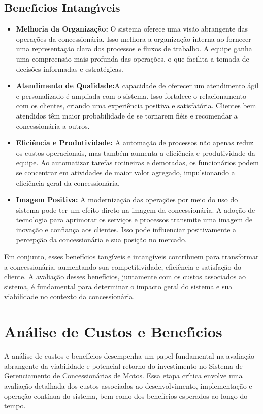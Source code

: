        \subsection{Benef\'{\i}cios Intang\'{\i}veis}
		\begin{itemize}
			\item \textbf{Melhoria da Organização:} O sistema oferece uma visão abrangente das operações da concessionária. Isso melhora a organização interna ao fornecer uma representação clara dos processos e fluxos de trabalho. A equipe ganha uma compreensão mais profunda das operações, o que facilita a tomada de decisões informadas e estratégicas.
			
			\item \textbf{Atendimento de Qualidade:}A capacidade de oferecer um atendimento ágil e personalizado é ampliada com o sistema. Isso fortalece o relacionamento com os clientes, criando uma experiência positiva e satisfatória. Clientes bem atendidos têm maior probabilidade de se tornarem fiéis e recomendar a concessionária a outros.
			
			\item \textbf{Eficiência e Produtividade:}  A automação de processos não apenas reduz os custos operacionais, mas também aumenta a eficiência e produtividade da equipe. Ao automatizar tarefas rotineiras e demoradas, os funcionários podem se concentrar em atividades de maior valor agregado, impulsionando a eficiência geral da concessionária.
			
			\item \textbf{Imagem Positiva:} A modernização das operações por meio do uso do sistema pode ter um efeito direto na imagem da concessionária. A adoção de tecnologia para aprimorar os serviços e processos transmite uma imagem de inovação e confiança aos clientes. Isso pode influenciar positivamente a percepção da concessionária e sua posição no mercado.\\
		\end{itemize}
	
Em conjunto, esses benefícios tangíveis e intangíveis contribuem para transformar a concessionária, aumentando sua competitividade, eficiência e satisfação do cliente. A avaliação desses benefícios, juntamente com os custos associados ao sistema, é fundamental para determinar o impacto geral do sistema e sua viabilidade no contexto da concessionária.

\section{An\'{a}lise de Custos e Benef\'{\i}cios}
A análise de custos e benefícios desempenha um papel fundamental na avaliação abrangente da viabilidade e potencial retorno do investimento no Sistema de Gerenciamento de Concessionárias de Motos. Essa etapa crítica envolve uma avaliação detalhada dos custos associados ao desenvolvimento, implementação e operação contínua do sistema, bem como dos benefícios esperados ao longo do tempo.

